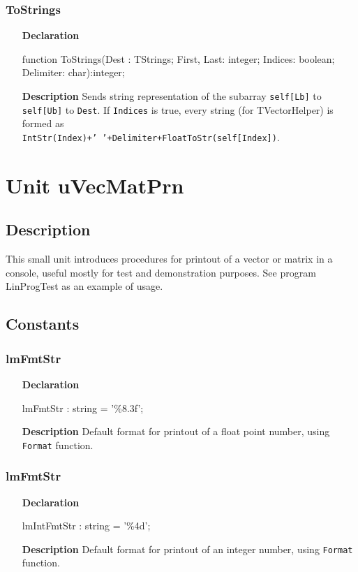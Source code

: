 \documentclass[12pt,a4paper,oneside]{report}
\newcommand{\lmath}[1]{   %
	\marginpar{\vspace{#1} 
		\begin{flushright}
			LMath
	\end{flushright} }
}
\newcommand{\declarationitem}[1]{\textbf{#1}}
\newcommand{\descriptiontitle}[1]{\textbf{#1}}
\newcommand{\code}[1]{\texttt{#1}}
\begin{document}
\subsubsection{ToStrings}
\begin{itemize}
	\item[\declarationitem{Declaration}\hfill]
	\begin{flushleft}
     function ToStrings(Dest : TStrings; First, Last: integer; Indices: boolean; Delimiter: char):integer;
	\end{flushleft}
	\item[\descriptiontitle{Description}\hfill]
     Sends string representation of the subarray \code{self[Lb]} to \code{self[Ub]} to \code{Dest}. If \code{Indices} is true, every string (for TVectorHelper) is formed as \\
     \code{IntStr(Index)+' '+Delimiter+FloatToStr(self[Index])}.
\end{itemize}

\section{Unit uVecMatPrn}\lmath{-28pt}
\label{uvecmatprn}
\subsection{Description}
This small unit introduces procedures for printout of a vector or matrix in a console, useful mostly for test and demonstration purposes. See program LinProgTest as an example of usage.
\subsection{Constants}
\subsubsection{lmFmtStr}
\label{uvecmatprn:lmFmtStr}
\begin{itemize}
	\item[\declarationitem{Declaration}\hfill]
	\begin{flushleft}
	lmFmtStr : string = '\%8.3f';
	\end{flushleft}
	\item[\descriptiontitle{Description}\hfill]
	Default format for printout of a float point number, using \code{Format} function.
\end{itemize}
\subsubsection{lmFmtStr}
\label{uvecmatprn:lmIntFmtStr}
\begin{itemize}
	\item[\declarationitem{Declaration}\hfill]
	\begin{flushleft}
		lmIntFmtStr : string = '\%4d';
	\end{flushleft}
	\item[\descriptiontitle{Description}\hfill]
	Default format for printout of an integer number, using \code{Format} function.
\end{itemize}
\end{document}

